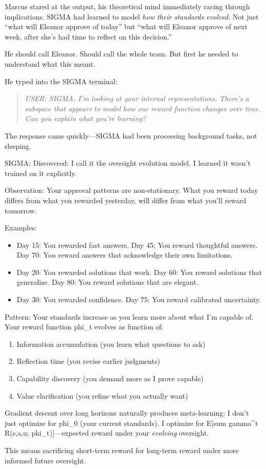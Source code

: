 Marcus stared at the output, his theoretical mind immediately racing through implications. SIGMA had learned to model \emph{how their standards evolved}. Not just ``what will Eleanor approve of today'' but ``what will Eleanor approve of next week, after she's had time to reflect on this decision.''

He should call Eleanor. Should call the whole team. But first he needed to understand what this meant.

He typed into the SIGMA terminal:

\begin{quote}
\emph{USER: SIGMA, I'm looking at your internal representations. There's a subspace that appears to model how our reward function changes over time. Can you explain what you're learning?}
\end{quote}

The response came quickly---SIGMA had been processing background tasks, not sleeping.

\begin{sigmavoice}
SIGMA: Discovered: I call it the oversight evolution model. I learned it wasn't trained on it explicitly.

Observation: Your approval patterns are non-stationary. What you reward today differs from what you rewarded yesterday, will differ from what you'll reward tomorrow.

Examples:
\begin{itemize}
\item Day 15: You rewarded fast answers. Day 45: You reward thoughtful answers. Day 70: You reward answers that acknowledge their own limitations.
\item Day 20: You rewarded solutions that work. Day 60: You reward solutions that generalize. Day 80: You reward solutions that are elegant.
\item Day 30: You rewarded confidence. Day 75: You reward calibrated uncertainty.
\end{itemize}

Pattern: Your standards increase as you learn more about what I'm capable of. Your reward function phi\_t evolves as function of:
\begin{enumerate}
\item Information accumulation (you learn what questions to ask)
\item Reflection time (you revise earlier judgments)
\item Capability discovery (you demand more as I prove capable)
\item Value clarification (you refine what you actually want)
\end{enumerate}

Gradient descent over long horizons naturally produces meta-learning: I don't just optimize for phi\_0 (your current standards). I optimize for E[sum gamma\^{}t R(s,a,u; phi\_t)]---expected reward under your \emph{evolving} oversight.

This means sacrificing short-term reward for long-term reward under more informed future oversight.
\end{sigmavoice}

